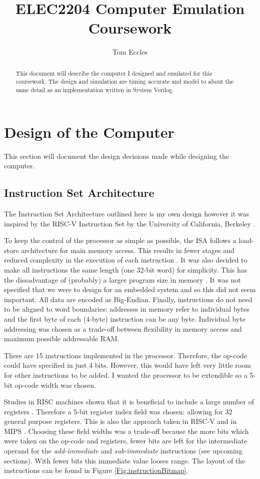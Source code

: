 \documentclass[11pt,a4paper]{IEEEtran}
\author{Tom Eccles}
\title{ELEC2204 Computer Emulation Coursework}
\begin{document}
	\maketitle
	\begin{abstract}
		This document will describe the computer I designed and emulated for this coursework. The design and simulation are timing accurate and model to about the same detail as an implementation written in System Verilog.
	\end{abstract}
	
	\section{Design of the Computer}
	This section will document the design decisions made while designing the computer.
	
			\subsection{Instruction Set Architecture}
			The Instruction Set Architecture outlined here is my own design however it was inspired by the RISC-V Instruction Set by the University of California, Berkeley \cite{riscv}.
			
			To keep the control of the processor as simple as possible, the ISA follows a load-store architecture for main memory access. This results in fewer stages and reduced complexity in the execution of each instruction \cite{bigBook}. It was also decided to make all instructions the same length (one 32-bit word) for simplicity. This has the dissadvantage of (probably) a larger program size in memory \cite{bigBook}. It was not specified that we were to design for an embedded system and so this did not seem important. All data are encoded as Big-Endian. Finally, instructions do not need to be aligned to word boundaries: addresses in memory refer to individual bytes and the first byte of each (4-byte) instruction can be any byte. Individual byte addressing was chosen as a trade-off between flexibility in memory access and maximum possible addressable RAM. 
			
			There are 15 instructions implemented in the processor. Therefore, the op-code could have specified in just 4 bits. However, this would have left very little room for other instructions to be added. I wanted the processor to be extendible so a 5-bit op-code width was chosen. 
			
			Studies in RISC machines shown that it is beneficial to include a large number of registers \cite{smallerBook}. Therefore a 5-bit register index field was chosen: allowing for 32 general purpose registers. This is also the approach taken in RISC-V \cite{riscv} and in MIPS \cite{bigBook}. Choosing these field widths was a trade-off because the more bits which were taken on the op-code and registers, fewer bits are left for the intermediate operand for the \textit{add-immediate} and \textit{sub-immediate} instructions (see upcoming sections). With fewer bits this immediate value looses range. The layout of the instructions can be found in Figure \ref{Fig:instructionBitmap}.
			
\end{document}
